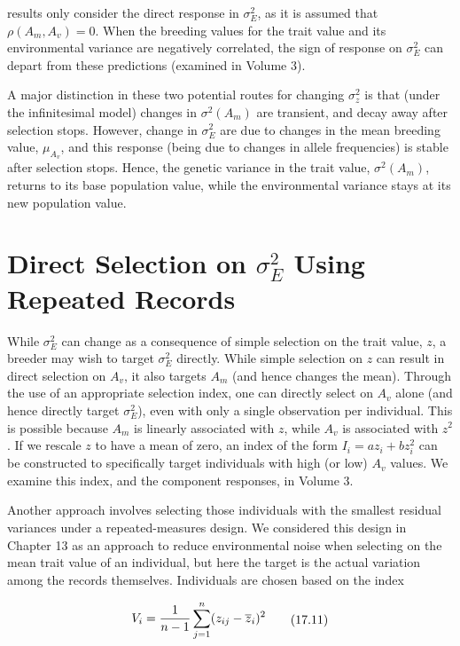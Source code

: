 \documentclass{article}
\begin{document}
results only consider the direct response in  $ \sigma_E^2 $, as it is assumed that  $ \rho(A_m, A_v) = 0 $. When the breeding values for the trait value and its environmental variance are negatively correlated, the sign of response on  $ \sigma_E^2 $ can depart from these predictions (examined in Volume 3).

A major distinction in these two potential routes for changing  $ \sigma_z^2 $ is that (under the infinitesimal model) changes in  $ \sigma^2(A_m) $ are transient, and decay away after selection stops. However, change in  $ \sigma_E^2 $ are due to changes in the mean breeding value,  $ \mu_{A_v} $, and this response (being due to changes in allele frequencies) is stable after selection stops. Hence, the genetic variance in the trait value,  $ \sigma^2(A_m) $, returns to its base population value, while the environmental variance stays at its new population value.

\section{Direct Selection on  $ \sigma_{E}^{2} $ Using Repeated Records}
While  $ \sigma_E^2 $ can change as a consequence of simple selection on the trait value,  $ z $, a breeder may wish to target  $ \sigma_E^2 $ directly. While simple selection on  $ z $ can result in direct selection on  $ A_v $, it also targets  $ A_m $ (and hence changes the mean). Through the use of an appropriate selection index, one can directly select on  $ A_v $ alone (and hence directly target  $ \sigma_E^2 $), even with only a single observation per individual. This is possible because  $ A_m $ is linearly associated with  $ z $, while  $ A_v $ is associated with  $ z^2 $. If we rescale  $ z $ to have a mean of zero, an index of the form  $ I_i = az_i + bz_i^2 $ can be constructed to specifically target individuals with high (or low)  $ A_v $ values. We examine this index, and the component responses, in Volume 3.

Another approach involves selecting those individuals with the smallest residual variances under a repeated-measures design. We considered this design in Chapter 13 as an approach to reduce environmental noise when selecting on the mean trait value of an individual, but here the target is the actual variation among the records themselves. Individuals are chosen based on the index

\begin{equation}
\begin{align*}V_i={1\over n-1}\sum_{j=1}^n(z_{ij}-\overline{z}_i)^2\end{align*}
\tag{17.11}
\label{eq:17_11}
\end{equation}
\end{document}
